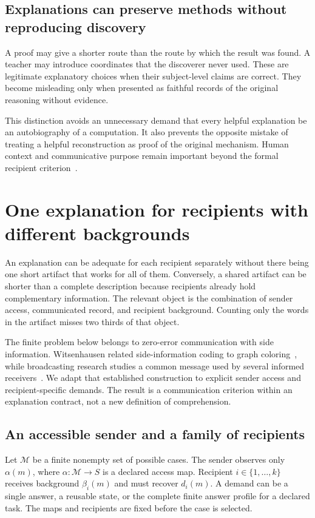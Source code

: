 \documentclass[11pt,letterpaper]{article}
\theoremstyle{plain}
\theoremstyle{definition}
\newcommand{\M}{\mathcal M}\newcommand{\E}{\mathbb E}
\begin{document}
\subsection{Explanations can preserve methods without reproducing discovery}
A proof may give a shorter route than the route by which the result was found. A teacher may introduce coordinates that the discoverer never used. These are legitimate explanatory choices when their subject-level claims are correct. They become misleading only when presented as faithful records of the original reasoning without evidence.

This distinction avoids an unnecessary demand that every helpful explanation be an autobiography of a computation. It also prevents the opposite mistake of treating a helpful reconstruction as proof of the original mechanism. Human context and communicative purpose remain important beyond the formal recipient criterion~\cite{miller}.

\section{One explanation for recipients with different backgrounds}\label{sec:audience}
An explanation can be adequate for each recipient separately without there being one short artifact that works for all of them. Conversely, a shared artifact can be shorter than a complete description because recipients already hold complementary information. The relevant object is the combination of sender access, communicated record, and recipient background. Counting only the words in the artifact misses two thirds of that object.

The finite problem below belongs to zero-error communication with side information. Witsenhausen related side-information coding to graph coloring~\cite{witsenhausen}, while broadcasting research studies a common message used by several informed receivers~\cite{alon}. We adapt that established construction to explicit sender access and recipient-specific demands. The result is a communication criterion within an explanation contract, not a new definition of comprehension.

\subsection{An accessible sender and a family of recipients}
Let $\M$ be a finite nonempty set of possible cases. The sender observes only $\alpha(m)$, where $\alpha:\M\to S$ is a declared access map. Recipient $i\in\{1,\ldots,k\}$ receives background $\beta_i(m)$ and must recover $d_i(m)$. A demand can be a single answer, a reusable state, or the complete finite answer profile for a declared task. The maps and recipients are fixed before the case is selected.
\end{document}
